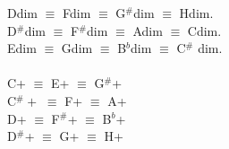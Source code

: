 \documentclass[12pt]{article}
\begin{document}
\noindent Ddim $\equiv$ Fdim $\equiv$ G${}^\#$dim $\equiv$ Hdim.
\\ D${}^\#$dim $\equiv$ F${}^\#$dim $\equiv$ Adim $\equiv$ Cdim. 
\\ Edim $\equiv$ Gdim $\equiv$ B${}^b$dim $\equiv$ C${}^\#$ dim.
\\
\\ C+ $\equiv$ E+ $\equiv$ G${}^{\#}$+
\\ C${}^{\#}+$ $\equiv$ F+ $\equiv$ A+
\\ D+ $\equiv$ F${}^\#$+ $\equiv$ B${}^b$+
\\ D${}^\#$+ $\equiv$ G+ $\equiv$ H+
\end{document}
